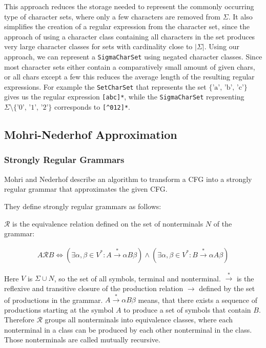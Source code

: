 This approach reduces the storage needed to represent the commonly occurring type of character sets, where only a few characters are removed from $\Sigma$. It also simplifies the creation of a regular expression from the character set, since the approach of using a character class containing all characters in the set produces very large character classes for sets with cardinality close to $|\Sigma|$. Using our approach, we can represent a \lstinline|SigmaCharSet| using negated character classes. Since most character sets either contain a comparatively small amount of given chars, or all chars except a few this reduces the average length of the resulting regular expressions. 
For example the \lstinline|SetCharSet| that represents the set $\{\text{'a', 'b', 'c'}\}$ gives us the regular expression \lstinline|[abc]*|, while the \lstinline|SigmaCharSet| representing $\Sigma \setminus \{\text{'0', '1', '2'}\}$ corresponds to \lstinline|[^012]*|.

		
\subsection{Mohri-Nederhof Approximation}

\subsubsection{Strongly Regular Grammars}
Mohri and Nederhof describe an algorithm to transform a \ac{CFG} into a strongly regular grammar that approximates the given \ac{CFG}.

They define strongly regular grammars as follows:

$\mathcal{R}$ is the equivalence relation defined on the set of nonterminals $N$ of the grammar:

\begin{align}
	 A \mathcal{R} B \Leftrightarrow (\exists \alpha, \beta \in V^* : A \xrightarrow{*} \alpha B \beta) \land (\exists \alpha, \beta \in V^* : B \xrightarrow{*} \alpha A \beta) 
\end{align}

Here $V$ is $\Sigma \cup N$, so the set of all symbols, terminal and nonterminal. $\xrightarrow{*}$ is the reflexive and transitive closure of the production relation $\rightarrow$ defined by the set of productions in the grammar. $A \xrightarrow{*} \alpha B \beta$ means, that there exists a sequence of productions starting at the symbol $A$ to produce a set of symbols that contain $B$. Therefore $\mathcal{R}$ groups all nonterminals into equivalence classes, where each nonterminal in a class can be produced by each other nonterminal in the class. Those nonterminals are called mutually recursive.

